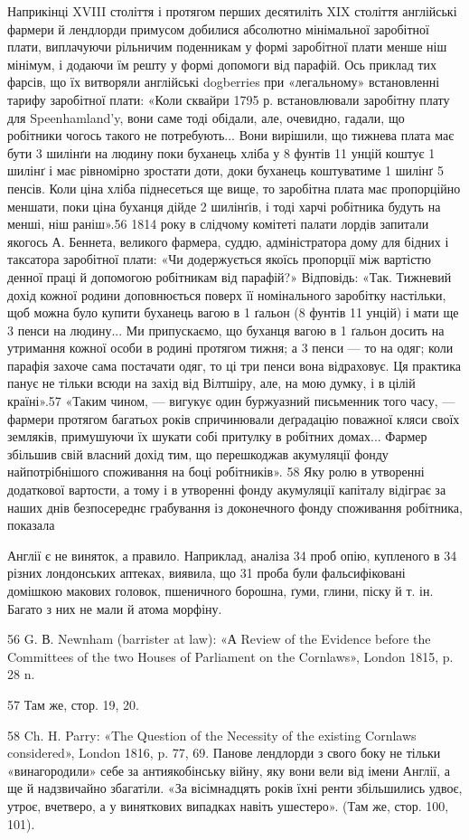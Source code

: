Наприкінці XVIII століття і протягом перших десятиліть
XIX століття англійські фармери й лендлорди примусом добилися
абсолютно мінімальної заробітної плати, виплачуючи рільничим
поденникам у формі заробітної плати менше ніш мінімум,
і додаючи їм решту у формі допомоги від парафій. Ось приклад
тих фарсів, що їх витворяли англійські dogberries при «легальному»
встановленні тарифу заробітної плати: «Коли сквайри
1795 р. встановлювали заробітну плату для Speenhamland’y,
вони саме тоді обідали, але, очевидно, гадали, що робітники
чогось такого не потребують... Вони вирішили, що тижнева
плата має бути 3 шилінґи на людину поки буханець хліба
у 8 фунтів 11 унцій коштує 1 шилінґ і має рівномірно зростати
доти, доки буханець коштуватиме 1 шилінґ 5 пенсів.
Коли ціна хліба піднесеться ще вище, то заробітна плата
має пропорційно меншати, поки ціна буханця дійде 2 шилінґів,
і тоді харчі робітника будуть на  менші, ніш раніш».56
1814 року в слідчому комітеті палати лордів запитали якогось
А. Беннета, великого фармера, суддю, адміністратора дому для
бідних і таксатора заробітної плати: «Чи додержується якоїсь
пропорції між вартістю денної праці й допомогою робітникам
від парафій?» Відповідь: «Так. Тижневий дохід кожної родини
доповнюється поверх її номінального заробітку настільки, щоб
можна було купити буханець вагою в 1 ґальон (8 фунтів 11 унцій)
і мати ще 3 пенси на людину... Ми припускаємо, що буханця
вагою в 1 ґальон досить на утримання кожної особи в родині
протягом тижня; а 3 пенси — то на одяг; коли парафія захоче
сама постачати одяг, то ці три пенси вона відраховує. Ця практика
панує не тільки всюди на захід від Вілтшіру, але, на мою
думку, і в цілій країні».57 «Таким чином, — вигукує один буржуазний
письменник того часу, — фармери протягом багатьох років
спричинювали деґрадацію поважної кляси своїх земляків, примушуючи
їх шукати собі притулку в робітних домах... Фармер
збільшив свій власний дохід тим, що перешкоджав акумуляції
фонду найпотрібнішого споживання на боці робітників». 58 Яку
ролю в утворенні додаткової вартости, а тому і в утворенні
фонду акумуляції капіталу відіграє за наших днів безпосереднє
грабування із доконечного фонду споживання робітника, показала

Англії є не виняток, а правило. Наприклад, аналіза 34 проб опію, купленого
в 34 різних лондонських аптеках, виявила, що 31 проба були фальсифіковані
домішкою макових головок, пшеничного борошна, ґуми,
глини, піску й т. ін. Багато з них не мали й атома морфіну.

56 G. В. Newnham (barrister at law): «А Review of the Evidence
before the Committees of the two Houses of Parliament on the Cornlaws»,
London 1815, p. 28 n.

57 Там же, стор. 19, 20.

58 Ch. H. Parry: «The Question of the Necessity of the existing Cornlaws
considered», London 1816, p. 77, 69. Панове лендлорди з свого боку
не тільки «винагородили» себе за антиякобінську війну, яку вони вели
від імени Англії, а ще й надзвичайно збагатіли. «За вісімнадцять років
їхні ренти збільшились удвоє, утроє, вчетверо, а у виняткових випадках
навіть ушестеро». (Там же, стор. 100, 101).
